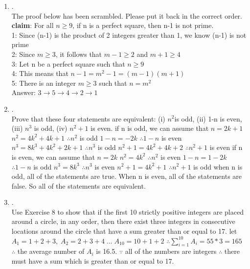 \documentclass{article}
\theoremstyle{definition}
\theoremstyle{plain}
\begin{document}
\begin {enumerate}[itemindent=30pt,label=\bf Exercise {\arabic*}:]
\subitem So my hypothesis is false, which means that there are at least one of the real numbers $a_{1}, a_{2}, ..., a_{n}$ is greater than or equal to the average of these numbers.
\subitem I proof is by contrapositive.
\newpage
\item .\\
The proof below has been scrambled. Please put it back in the correct order.\\
\textbf{claim}: For all $n \geqslant 9$, if n is a perfect square, then n-1 is not prime.\\
1: Since (n-1) is the product of 2 integers greater than 1, we know (n-1) is not prime\\
2: Since $m \geqslant 3$, it follows that $m-1 \geqslant 2$ and $m+1 \geqslant 4$\\
3: Let n be a perfect square such that $n \geqslant 9$ \\
4: This means that $n-1 = m^{2}-1 = (m-1)(m+1)$\\
5: There is an integer $m \geqslant 3$ such that $n = m^{2}$\\
\subitem Answer:
\subitem $3 \to 5 \to 4 \to 2 \to 1$
\item .\\
Prove that these four statements are equivalent: (i) $n^{2}$is odd, (ii) 1-n is even, (iii) $n^{3}$ is odd, (iv) $n^{2}+1$ is even.
\subitem if n is odd, we can assume that $n = 2k + 1$
\subitem $n^{2} = 4k^{2} + 4k +1$
\subitem $\therefore n^{2}$ is odd
\subitem $1 - n = -2k$
\subitem $\therefore 1 - n$ is even
\subitem $n^{3} = 8k^{3} + 4k^{2} + 2k + 1$
\subitem $\therefore n^{3}$ is odd
\subitem $n^{2} + 1 = 4k^{2} + 4k + 2$
\subitem $\therefore n^{2} + 1$ is even 
\subitem if n is even, we can assume that $n = 2k$
\subitem $n^{2} = 4k^{2}$
\subitem $\therefore n^{2}$ is even
\subitem $1 - n = 1-2k$
\subitem $\therefore 1 - n$ is odd
\subitem $n^{3} = 8k^{3}$
\subitem $\therefore n^{3}$ is even
\subitem $n^{2} + 1 = 4k^{2} + 1$
\subitem $\therefore n^{2} + 1$ is odd
\subitem when n is odd, all of the statements are true. When n is even, all of the statements are false. So all of the statements are equivalent.

\item .\\
Use Exercise 8 to show that if the first 10 strictly positive integers are placed around a circle, in any order, then there exist three integers in consecutive locations around the circle that have a sum greater than or equal to 17.
\subitem let $A_{1} = 1 + 2 + 3,\;A_{2} =  2 + 3 + 4\;...\;A_{10} = 10 + 1 + 2$ 
\subitem $\therefore \sum\limits_{i=1}^{10} A_{i} = 55*3 = 165$
\subitem $\therefore$ the average number of $A_{i}$ is 16.5.
\subitem $\because$ all of the numbers are integers 
\subitem $\therefore$ there must have a sum which is greater than or equal to 17.
\end{enumerate}
\end{document}
